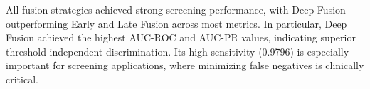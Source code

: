 \documentclass[preprint,12pt]{elsarticle}
\begin{document}
\begin{table}[htb]
    \centering
    \caption{Comprehensive test set performance metrics for binary glaucoma screening (best model per fusion strategy).}
    \label{performance-metrics-table}
    \scriptsize
    \setlength{\tabcolsep}{6pt}
\end{table}

All fusion strategies achieved strong screening performance, with Deep Fusion outperforming Early and Late Fusion across most metrics. In particular, Deep Fusion achieved the highest AUC-ROC and AUC-PR values, indicating superior threshold-independent discrimination. Its high sensitivity (0.9796) is especially important for screening applications, where minimizing false negatives is clinically critical.
\end{document}
